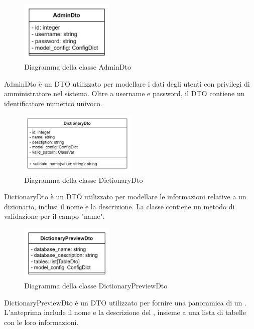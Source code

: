  \label{AdminDto}
\begin{figure}[H]
    \centering
    \includegraphics[width=0.4\textwidth]{assets/Backend/admin_dto.png}
    \caption{Diagramma della classe AdminDto}
  \end{figure}
\par AdminDto è un DTO utilizzato per modellare i dati degli utenti con privilegi di amministratore nel sistema. Oltre a username e password, il DTO contiene un identificatore numerico univoco.

 \label{DictionaryDto}
\begin{figure}[H]
    \centering
    \includegraphics[width=0.5\textwidth]{assets/Backend/dictionary_dto.png}
    \caption{Diagramma della classe DictionaryDto}
\end{figure}
\par DictionaryDto è un DTO utilizzato per modellare le informazioni relative a un dizionario, inclusi il nome e la descrizione. La classe contiene un metodo di validazione per il campo "name".

 \label{DictionaryPreviewDto}
\begin{figure}[H]
    \centering
    \includegraphics[width=0.4\textwidth]{assets/Backend/dictionary_preview_dto.png}
    \caption{Diagramma della classe DictionaryPreviewDto}
  \end{figure}
\par DictionaryPreviewDto è un DTO utilizzato per fornire una panoramica di un . L'anteprima include il nome e la descrizione del , insieme a una lista di tabelle con le loro informazioni.

